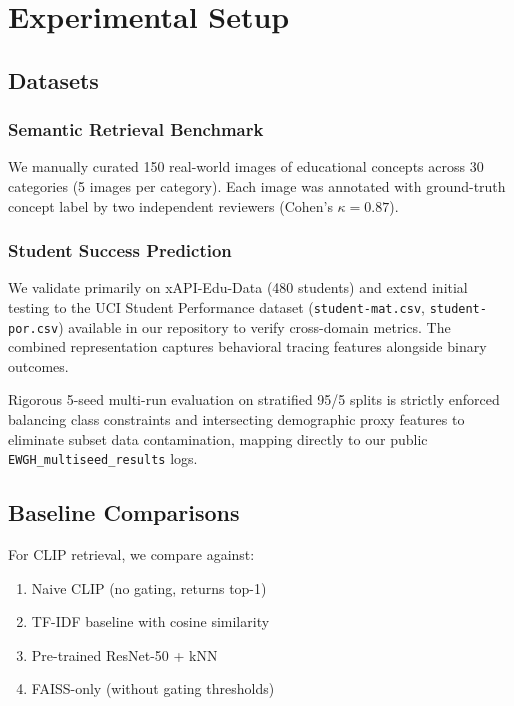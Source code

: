 \documentclass[conference]{IEEEtran}
\begin{document}
\section{Experimental Setup}

\subsection{Datasets}

\subsubsection{Semantic Retrieval Benchmark}

We manually curated 150 real-world images of educational concepts across 30 categories (5 images per category). Each image was annotated with ground-truth concept label by two independent reviewers (Cohen's $\kappa = 0.87$).

\subsubsection{Student Success Prediction}

We validate primarily on xAPI-Edu-Data (480 students) and extend initial testing to the UCI Student Performance dataset (\texttt{student-mat.csv}, \texttt{student-por.csv}) available in our repository to verify cross-domain metrics. The combined representation captures behavioral tracing features alongside binary outcomes.

Rigorous 5-seed multi-run evaluation on stratified 95/5 splits is strictly enforced balancing class constraints and intersecting demographic proxy features to eliminate subset data contamination, mapping directly to our public \texttt{EWGH\_multiseed\_results} logs.

\subsection{Baseline Comparisons}

For CLIP retrieval, we compare against:
\begin{enumerate}
    \item Naive CLIP (no gating, returns top-1)
    \item TF-IDF baseline with cosine similarity
    \item Pre-trained ResNet-50 + kNN
    \item FAISS-only (without gating thresholds)
\end{enumerate}
\end{document}
